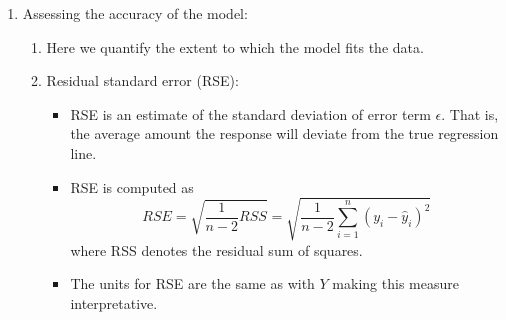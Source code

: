\documentclass{article}
\begin{document}
\begin{enumerate}
\begin{enumerate}
\item Back to linear regression: $SE$ formulas for the coefficient estimates.
\begin{itemize}
\item Formulas can be derived.
\[
SE(\hat{\beta}_1)^2 = \frac{\sigma^2}{\sum_{i=1}^n (x_i - \bar{x})^2}
\]

\[
SE(\hat{\beta}_0)^2 = \sigma^2 \left( \frac{1}{n} + \frac{\bar{x}^2}{\sum_{i=1}^n (x_i - \bar{x})^2} \right)
\]

where $\sigma^2 = Var(\epsilon)$ is the variance of errors, or estimated by $\hat{\sigma}^2 = \frac{1}{n-2} \sum_{i=1}^n (y_i - \hat{y}_i)^2 = \frac{RSS}{n-2}$.


\item Note that $SE(\hat{\beta}_1)$ is smaller when the $x_i$'s are more spread out. Intuitively we have more leverage to estimate the slope in this case. 
\item Also, $SE(\hat{\beta_0})$ would be the same as $SE(\hat{\mu})$ if $\overline{x}=0$ in which case $\beta_0$ would equal $\overline{y}$.
\item Generally $\sigma$ is unknown and estimated by the residual standard error (RSE) given above in terms of the residual sum of squares (RSS).
\item Standard errors give 95\% confidence intervals.
\[
\hat{\beta}_1 \pm 2 \cdot SE(\hat{\beta}_1), \quad \hat{\beta}_0 \pm 2 \cdot SE(\hat{\beta}_0)
\]
\item Standard errors can be used to conduct hypothesis tests. 
\[
H_0: \text{ There is no relationship between $X$ and $Y$}
\]
\[
H_a: \text{ There is a relationship between $X$ and $Y$}
\]
which translates to 
\[
H_0: \beta_1=0
\]
\[
H_a: \beta_1 \neq 0.
\]
Note, the null hypothesis translates to $Y=\beta_0 + \epsilon$ which is unrelated to $X$. 
We test with a $t$-statistic as with a single mean via a $t$-distribution with $n-2$ degrees of freedom.
\[
t = \frac{\hat{\beta}_1-0}{SE(\hat{\beta}_1} 
\]
\end{itemize}
\end{enumerate}

\item Assessing the accuracy of the model:
\begin{enumerate}
\item Here we quantify the extent to which the model fits the data.
\item Residual standard error (RSE):
\begin{itemize}
\item RSE is an estimate of the standard deviation of error term $\epsilon$. That is, the average amount the response will deviate from the true regression line.
\item RSE is computed as
\[
RSE = \sqrt{\frac{1}{n-2}RSS} = \sqrt{\frac{1}{n-2} \sum_{i=1}^n (y_i-\hat{y}_i)^2}
\]
where RSS denotes the residual sum of squares.
\item The units for RSE are the same as with $Y$ making this measure interpretative.
\end{itemize}


\end{enumerate}
\end{enumerate}
\end{document}

